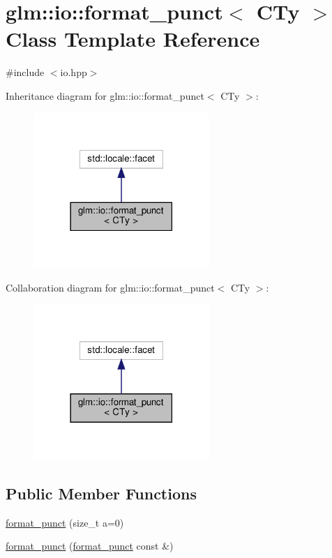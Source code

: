 \hypertarget{classglm_1_1io_1_1format__punct}{}\section{glm\+:\+:io\+:\+:format\+\_\+punct$<$ C\+Ty $>$ Class Template Reference}
\label{classglm_1_1io_1_1format__punct}


{\ttfamily \#include $<$io.\+hpp$>$}



Inheritance diagram for glm\+:\+:io\+:\+:format\+\_\+punct$<$ C\+Ty $>$\+:\nopagebreak
\begin{figure}[H]
\begin{center}
\leavevmode
\includegraphics[width=189pt]{classglm_1_1io_1_1format__punct__inherit__graph}
\end{center}
\end{figure}


Collaboration diagram for glm\+:\+:io\+:\+:format\+\_\+punct$<$ C\+Ty $>$\+:\nopagebreak
\begin{figure}[H]
\begin{center}
\leavevmode
\includegraphics[width=189pt]{classglm_1_1io_1_1format__punct__coll__graph}
\end{center}
\end{figure}
\subsection*{Public Member Functions}
\begin{DoxyCompactItemize}
\item 
\hyperlink{classglm_1_1io_1_1format__punct_ae56e7a14fac2516658837281b9da4659}{format\+\_\+punct} (size\+\_\+t a=0)
\item 
\hyperlink{classglm_1_1io_1_1format__punct_a89a8c3cfb0b975f3dd8c0416101c59b7}{format\+\_\+punct} (\hyperlink{classglm_1_1io_1_1format__punct}{format\+\_\+punct} const \&)
\end{DoxyCompactItemize}
